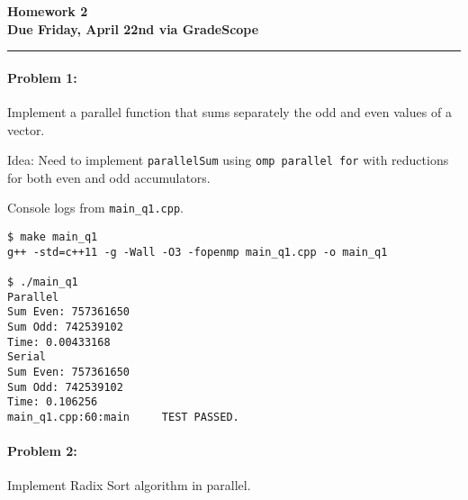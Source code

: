 \documentclass[12pt,letterpaper,twoside]{article}
\begin{document}
{\centering \textbf{Homework 2\\ Due Friday, April 22nd via GradeScope\\}}
\vspace*{-8pt}\noindent\rule{\linewidth}{1pt}

\paragraph{Problem 1: } Implement a parallel function that sums separately the odd
and even values of a vector. 

Idea: Need to implement \texttt{parallelSum} using \texttt{omp parallel for} with 
reductions for both even and odd accumulators.


Console logs from \texttt{main\_q1.cpp}.
\begin{verbatim}
$ make main_q1
g++ -std=c++11 -g -Wall -O3 -fopenmp main_q1.cpp -o main_q1

$ ./main_q1
Parallel
Sum Even: 757361650
Sum Odd: 742539102
Time: 0.00433168
Serial
Sum Even: 757361650
Sum Odd: 742539102
Time: 0.106256
main_q1.cpp:60:main     TEST PASSED.
\end{verbatim}


\paragraph{Problem 2: } Implement Radix Sort algorithm in parallel.
\end{document}
